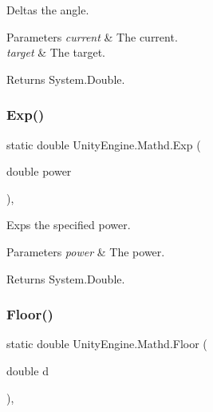 Deltas the angle. 


\begin{DoxyParams}{Parameters}
{\em current} & The current.\\
\hline
{\em target} & The target.\\
\hline
\end{DoxyParams}
\begin{DoxyReturn}{Returns}
System.\+Double.
\end{DoxyReturn}
\mbox{\label{struct_unity_engine_1_1_mathd_a605231eb33ba3f5baa93f994e98a359f}} 
\subsubsection{\texorpdfstring{Exp()}{Exp()}}
{\footnotesize\ttfamily static double Unity\+Engine.\+Mathd.\+Exp (\begin{DoxyParamCaption}\item[{double}]{power }\end{DoxyParamCaption})\hspace{0.3cm}{\ttfamily [inline]}, {\ttfamily [static]}}



Exps the specified power. 


\begin{DoxyParams}{Parameters}
{\em power} & The power.\\
\hline
\end{DoxyParams}
\begin{DoxyReturn}{Returns}
System.\+Double.
\end{DoxyReturn}
\mbox{\label{struct_unity_engine_1_1_mathd_a451e35cc077fa5cad080d81159475a49}} 
\subsubsection{\texorpdfstring{Floor()}{Floor()}}
{\footnotesize\ttfamily static double Unity\+Engine.\+Mathd.\+Floor (\begin{DoxyParamCaption}\item[{double}]{d }\end{DoxyParamCaption})\hspace{0.3cm}{\ttfamily [inline]}, {\ttfamily [static]}}




